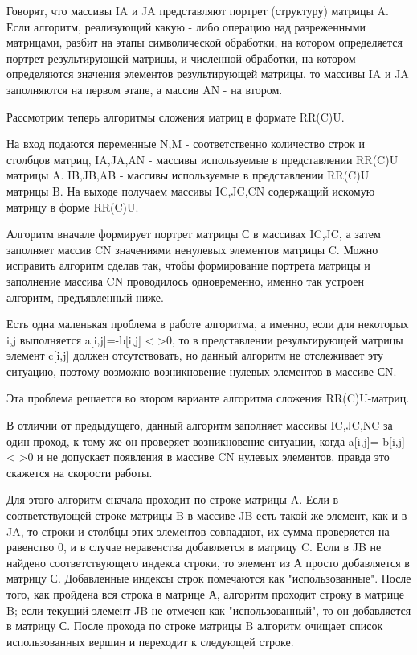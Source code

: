 Говорят, что массивы IA и JA представляют портрет (структуру) матрицы A. Если алгоритм, реализующий какую - либо операцию над разреженными матрицами, разбит на этапы символической обработки, на котором определяется портрет результирующей матрицы, и численной обработки, на котором определяются значения элементов результирующей матрицы, то массивы IA и JA заполняются на первом этапе, а массив AN - на втором. 

Рассмотрим теперь алгоритмы сложения матриц в формате RR(C)U.

На вход подаются переменные N,M - соответственно количество строк и столбцов матриц, IA,JA,AN - массивы используемые в представлении RR(C)U матрицы A. IB,JB,AB - массивы используемые в представлении RR(C)U матрицы B. На выходе получаем массивы IC,JC,CN содержащий искомую матрицу в форме RR(C)U. 

Алгоритм вначале формирует портрет матрицы С в массивах IC,JC, а затем заполняет массив CN значениями ненулевых элементов матрицы C. Можно исправить алгоритм сделав так, чтобы формирование портрета матрицы и заполнение массива CN проводилось одновременно, именно так устроен алгоритм, предъявленный ниже. 

Есть одна маленькая проблема в работе алгоритма, а именно, если для некоторых i,j выполняется a[i,j]=-b[i,j] < >0, то в представлении результирующей матрицы элемент c[i,j] должен отсутствовать, но данный алгоритм не отслеживает эту ситуацию, поэтому возможно возникновение нулевых элементов в массиве СN. 

Эта проблема решается во втором варианте алгоритма сложения RR(C)U-матриц.

В отличии от предыдущего, данный алгоритм заполняет массивы IC,JC,NC за один проход, к тому же он проверяет возникновение ситуации, когда a[i,j]=-b[i,j] < >0 и не допускает появления в массиве CN нулевых элементов, правда это скажется на скорости работы. 

Для этого алгоритм сначала проходит по строке матрицы A. Если в соответствующей строке матрицы B в массиве JB есть такой же элемент, как и в JA, то строки и столбцы этих элементов совпадают, их сумма проверяется на равенство 0, и в случае неравенства добавляется в матрицу C. Если в JB не найдено соответствующего индекса строки, то элемент из А просто добавляется в матрицу С. Добавленные индексы строк помечаются как "использованные". После того, как пройдена вся строка в матрице А, алгоритм проходит строку в матрице B; если текущий элемент JB не отмечен как "использованный", то он добавляется в матрицу С. После прохода по строке матрицы B алгоритм очищает список использованных вершин и переходит к следующей строке. 

